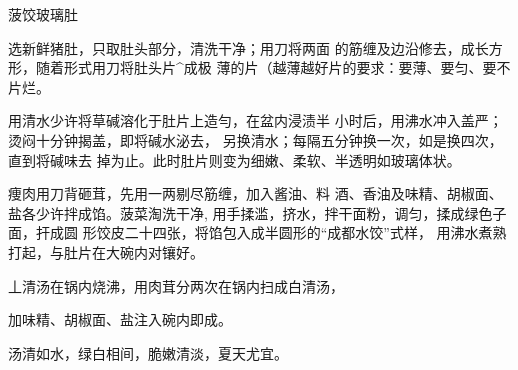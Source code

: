 \begin{recipe}{菠饺玻璃肚}

\ingredients


\cooking

\step 	选新鲜猪肚，只取肚头部分，清洗干净；用刀将两面 的筋缠及边沿修去，成长方形，随着形式用刀将肚头片^成极 薄的片（越薄越好片的要求：要薄、要匀、要不片烂。

\step 	用清水少许将草碱溶化于肚片上造勻，在盆内浸渍半 小时后，用沸水冲入盖严；烫闷十分钟揭盖，即将碱水泌去， 另换清水；每隔五分钟换一次，如是换四次，直到将碱味去 掉为止。此时肚片则变为细嫩、柔软、半透明如玻璃体状。

\step 	痩肉用刀背砸茸，先用一两剔尽筋缠，加入酱油、料 酒、香油及味精、胡椒面、盐各少许拌成馅。菠菜淘洗干净, 用手揉滥，挤水，拌干面粉，调匀，揉成绿色子面，扞成圆 形饺皮二十四张，将馅包入成半圆形的“成都水饺”式样， 用沸水煮熟打起，与肚片在大碗内对镶好。

丄清汤在锅内烧沸，用肉茸分两次在锅内扫成白清汤，

加味精、胡椒面、盐注入碗内即成。

\notes

汤清如水，绿白相间，脆嫩清淡，夏天尤宜。

\end{recipe}

